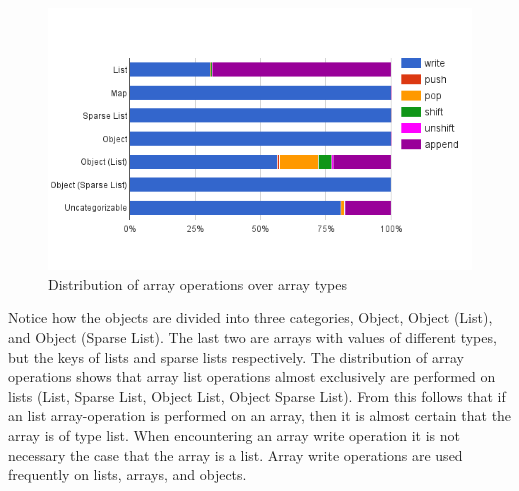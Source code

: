 \begin{figure}
\centering
\includegraphics[width=\textwidth]{chapters/study/g12.png}
\caption{Distribution of array operations over array types}
\label{fig:type_operations}
\end{figure}

Notice how the objects are divided into three categories, Object, Object (List), and Object (Sparse List).  The last two are arrays with values of different types, but the keys of lists and sparse lists respectively. The distribution of array operations shows that array list operations almost exclusively are performed on lists (List, Sparse List, Object List, Object Sparse List). From this follows that if an list array-operation is performed on an array, then it is almost certain that the array is of type list. When encountering an array write operation it is not necessary the case that the array is a list. Array write operations are used frequently on lists, arrays, and objects.







